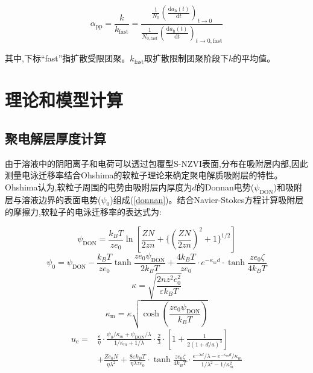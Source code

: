 \begin{equation}\label{alpha_ppexp}
  \alpha_{\mathrm{pp}}=\frac{k}{k_{\mathrm{fast}}}=\frac{\frac{1}{N_0}\left(\frac{\mathrm{d}a_\mathrm{h}(t)}{\mathrm{d}t}\right)_{t\rightarrow0}}{\frac{1}{N_{0,\mathrm{fast}}}\left(\frac{\mathrm{d}a_\mathrm{h}(t)}{\mathrm{d}t}\right)_{t\rightarrow0,\mathrm{fast}}}
\end{equation}

其中,下标“fast”指扩散受限团聚。$k_{\mathrm{fast}}$取扩散限制团聚阶段下$k$的平均值。

\section{理论和模型计算}

\subsection{聚电解层厚度计算}

由于溶液中的阴阳离子和电荷可以透过包覆型S-NZVI表面,分布在吸附层内部,因此测量电泳迁移率结合Ohshima的软粒子理论来确定聚电解质吸附层的特性。Ohshima认为,软粒子周围的电势由吸附层内厚度为$d$的Donnan电势($\psi_\mathrm{DON}$)和吸附层与溶液边界的表面电势($\psi_\mathrm{0}$)组成\cite{2006315,OHSHIMA20152,Ohshima1995}(\cref{donnan})。结合Navier-Stokes方程计算吸附层的摩擦力,软粒子的电泳迁移率的表达式为\cite{Oshima1992}:

\begin{equation}\label{psidon}
    \psi _\mathrm{DON}=\frac{k_BT}{ze_0}\ln[\frac{ZN}{2zn}+\{(\frac{ZN}{2zn})^2+1\}^{1/2}]
\end{equation}
\begin{equation}\label{psi0}
    \psi_0=\psi_\mathrm{DON}-\frac{k_BT}{ze_0}\tanh\frac{ze_0\psi_\mathrm{DON}}{2k_BT}+\frac{4k_BT}{ze_0}\cdot e^{-\kappa_md}\cdot\tanh\frac{ze_0\zeta }{4k_BT}
\end{equation}
\begin{equation}
    \kappa=\sqrt{\frac{2nz^2e_0^2}{\varepsilon k_B T}}
\end{equation}
\begin{equation}
    \kappa_\mathrm{m}=\kappa\sqrt{\cosh(\frac{ze_0\psi_\mathrm{DON}}{k_BT})}
\end{equation}
\begin{align}\label{ue}
    u_\mathrm{e}=&\frac{\varepsilon}{\eta }\cdot\frac{\psi _0/\kappa _m+\psi _\mathrm{DON}/\lambda }{1/\kappa _m+1/\lambda }\cdot\frac{2}{3}\cdot[1+\frac{1}{2(1+d/a)^3}]\\ &+\frac{Ze_0N}{\eta \lambda ^2}+\frac{8\varepsilon k_BT}{\eta \lambda ze_0}\cdot\tanh \frac{ze_0\zeta}{4k_BT}\cdot\frac{e^{-\lambda d}/\lambda -e^{-\kappa _md}/\kappa _m}{1/\lambda ^2-1/\kappa _m^2}\nonumber
\end{align}

